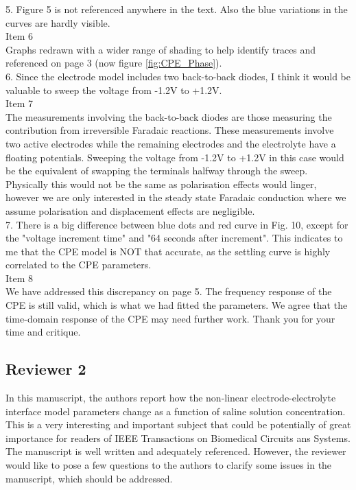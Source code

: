 \documentclass[journal, a4paper]{IEEEtran}
\begin{document}
{{5. Figure 5 is not referenced anywhere in the text. Also the blue variations in the curves are hardly visible.\\
{\color{OliveGreen} 
    Item 6\\
    Graphs redrawn with a wider range of shading to help identify traces and referenced on page 3 (now figure \ref{fig:CPE_Phase}).
}\\

6. Since the electrode model includes two back-to-back diodes, I think it would be valuable to sweep the voltage from -1.2V to +1.2V.\\
{\color{OliveGreen}
    Item 7\\
    The measurements involving the back-to-back diodes are those measuring the contribution from irreversible Faradaic reactions. These measurements involve two active electrodes while the remaining electrodes and the electrolyte have a floating potentials. Sweeping the voltage from -1.2V to +1.2V in this case would be the equivalent of swapping the terminals halfway through the sweep. Physically this would not be the same as polarisation effects would linger, however we are only interested in the steady state Faradaic conduction where we assume polarisation and displacement effects are negligible.
}\\

7. There is a big difference between blue dots and red curve in Fig. 10, except for the "voltage increment time" and "64 seconds after increment".  This indicates to me that the CPE model is NOT that accurate, as the settling curve is highly correlated to the CPE parameters.\\
{\color{OliveGreen}
    Item 8\\
    We have addressed this discrepancy on page 5. The frequency response of the CPE is still valid, which is what we had fitted the parameters. We agree that the time-domain response of the CPE may need further work. Thank you for your time and critique. 
}\\
}

\subsection*{Reviewer 2}

{\color{blue}
In this manuscript, the authors report how the non-linear electrode-electrolyte interface model parameters change as a function of saline solution concentration. This is a very interesting and important subject that could be potentially of great importance for readers of IEEE Transactions on Biomedical Circuits ans Systems. The manuscript is well written and adequately referenced. However, the reviewer would like to pose a few questions to the authors to clarify some  issues in the manuscript, which should be addressed.\\

}}
\end{document}

